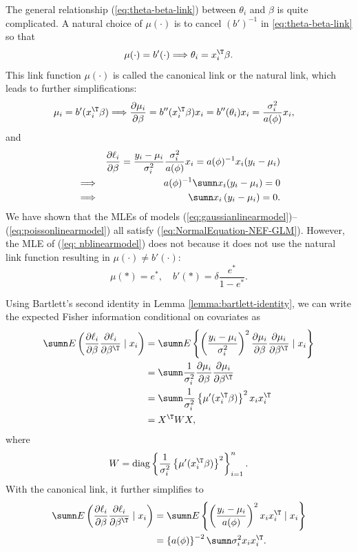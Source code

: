 The general relationship (\ref{eq:theta-beta-link}) between $\theta_{i}$
and $\beta$ is quite complicated. A natural choice of $\mu(\cdot)$
is to cancel $(b')^{-1}$ in \eqref{eq:theta-beta-link} so that 
\[
\mu(\cdot)=b'(\cdot)\Longrightarrow\theta_{i}=x_{i}^{\T}\beta.
\]
This link function $\mu(\cdot)$ is called the canonical link or the natural link, which leads
to further simplifications:
\begin{align*}
\mu_{i} & =b'(x_{i}^{\T}\beta)\Longrightarrow\frac{\partial\mu_{i}}{\partial\beta}=b''(x_{i}^{\T}\beta)x_{i}
= b''( \theta_i )x_{i}
=\frac{\sigma_{i}^{2}}{a(\phi)}x_{i},
\end{align*}
and 
\begin{eqnarray}
&&\frac{\partial\ell_{i}}{\partial\beta} = \frac{y_{i}-\mu_{i}}{\sigma_{i}^{2}}\frac{\sigma_{i}^{2}}{a(\phi)}x_{i} 
= a(\phi)^{-1} x_i (y_{i}-\mu_{i}) \nonumber  \\
& \Longrightarrow &
a(\phi)^{-1} \sumn  x_i (y_{i}-\mu_{i})    =0 \nonumber  \\
&\Longrightarrow &  \sumn x_{i}\left(y_{i}-\mu_{i}\right)=0.\label{eq:NormalEquation-NEF-GLM}
\end{eqnarray} 
We have shown that the MLEs of models (\ref{eq:gaussianlinearmodel})--(\ref{eq:poissonlinearmodel})
all satisfy (\ref{eq:NormalEquation-NEF-GLM}). However, the MLE of (\ref{eq: nblinearmodel})
does not because it does not use the natural link function resulting in $\mu(\cdot) \neq b'(\cdot) $: 
$$
\mu(*) = e^{*},\quad 
b'(*) = \delta \frac{e^*}{ 1 - e^*}. 
$$


 
Using Bartlett's second identity in Lemma \ref{lemma:bartlett-identity},
we can write the expected Fisher information conditional on covariates
as
\begin{align*}
\sumn E\left(\frac{\partial\ell_{i}}{\partial\beta}\frac{\partial\ell_{i}}{\partial\beta^{\T}}\mid x_{i}\right) & =\sumn E\left\{ \left(\frac{y_{i}-\mu_{i}}{\sigma_{i}^{2}}\right)^{2}\frac{\partial\mu_{i}}{\partial\beta}\frac{\partial\mu_{i}}{\partial\beta^{\T}}\mid x_{i}\right\} \\
 & =\sumn\frac{1}{\sigma_{i}^{2}}\frac{\partial\mu_{i}}{\partial\beta}\frac{\partial\mu_{i}}{\partial\beta^{\T}}\\
 & =\sumn\frac{1}{\sigma_{i}^{2}}\left\{ \mu'(x_{i}^{\T}\beta)\right\} ^{2}x_{i}x_{i}^{\T}\\
 & =X^{\T}WX,
\end{align*}
where 
\[
W=\text{diag}\left\{ \frac{1}{\sigma_{i}^{2}}\left\{ \mu'(x_{i}^{\T}\beta)\right\} ^{2}\right\} _{i=1}^{n}.
\]
With the canonical link, it further simplifies to
\begin{align*}
\sumn E\left(\frac{\partial\ell_{i}}{\partial\beta}\frac{\partial\ell_{i}}{\partial\beta^{\T}}\mid x_{i}\right) & =\sumn E\left\{ \left(\frac{y_{i}-\mu_{i}}{a(\phi)}\right)^{2}x_{i}x_{i}^{\T}\mid x_{i}\right\} \\
 & =\left\{ a(\phi)\right\} ^{-2}\sumn\sigma_{i}^{2}x_{i}x_{i}^{\T} . 
\end{align*}

